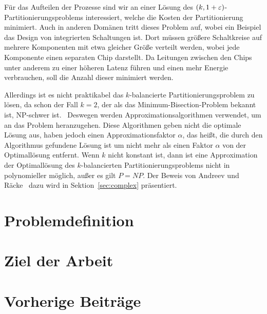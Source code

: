 Für das Aufteilen der Prozesse sind wir an einer Lösung des $(k, 1 + \varepsilon)$\hyp Partitionierungsproblems interessiert, welche die Kosten der Partitionierung minimiert.
Auch in anderen Domänen tritt dieses Problem auf, wobei ein Beispiel das Design von integrierten Schaltungen ist.
Dort müssen größere Schaltkreise auf mehrere Komponenten mit etwa gleicher Größe verteilt werden, wobei jede Komponente einen separaten Chip darstellt.
Da Leitungen zwischen den Chips unter anderem zu einer höheren Latenz führen und einen mehr Energie verbrauchen, soll die Anzahl dieser minimiert werden.

Allerdings ist es nicht praktikabel das $k$\hyp balancierte Partitionierungsproblem zu lösen, da schon der Fall $k=2$, der als das Minimum-Bisection-Problem bekannt ist, NP-schwer ist.~\cite{gj79}
Deswegen werden Approximationsalgorithmen verwendet, um an das Problem heranzugehen.
Diese Algorithmen geben nicht die optimale Lösung aus, haben jedoch einen Approximationsfaktor $\alpha$, das heißt, die durch den Algorithmus gefundene Lösung ist um nicht mehr als einen Faktor $\alpha$ von der Optimallösung entfernt.
Wenn $k$ nicht konstant ist, dann ist eine Approximation der Optimallösung des $k$\hyp balancierten Partitionierungsproblems nicht in polynomieller möglich, außer es gilt $P=NP$.
Der Beweis von Andreev und Räcke~\cite{ar06} dazu wird in Sektion~\ref{sec:complex} präsentiert.

\section{Problemdefinition}
\section{Ziel der Arbeit}
\section{Vorherige Beiträge}
